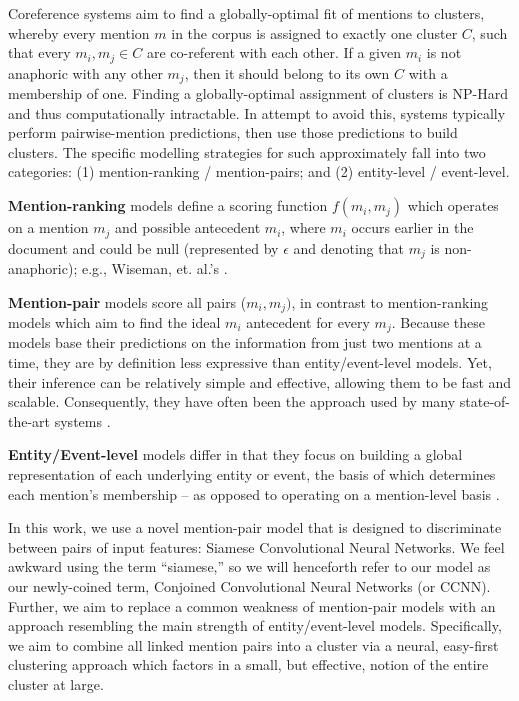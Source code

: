 \documentclass[11pt,a4paper]{article}
\begin{document}
Coreference systems aim to find a globally-optimal fit of mentions to clusters, whereby every mention $m$ in the corpus is assigned to exactly one cluster $C$, such that every ${m_i,m_j} \in C$ are co-referent with each other.  If a given $m_i$ is not anaphoric with any other $m_j$, then it should belong to its own $C$ with a membership of one.  Finding a globally-optimal assignment of clusters is NP-Hard and thus computationally intractable.  In attempt to avoid this, systems typically perform pairwise-mention predictions, then use those predictions to build clusters. The specific modelling strategies for such approximately fall into two categories: (1) mention-ranking / mention-pairs; and (2) entity-level / event-level.

\textbf{Mention-ranking} models define a scoring function $f(m_i,m_j)$ which operates on a mention $m_j$ and possible antecedent $m_i$, where $m_i$ occurs earlier in the document and could be null (represented by $\epsilon$ and denoting that $m_j$ is non-anaphoric); e.g., Wiseman, et. al.'s .

\textbf{Mention-pair} models score all pairs ($m_i,m_j)$, in contrast to mention-ranking models which aim to find the ideal $m_i$ antecedent for every $m_j$.  Because these models base their predictions on the information from just two mentions at a time, they are by definition less expressive than entity/event-level models.  Yet, their inference can be relatively simple and effective, allowing them to be fast and scalable.  Consequently, they have often been the approach used by many state-of-the-art systems \cite{Soon:2001:MLA:972597.972602,DBLP:conf/emnlp/DurrettK13}.

\textbf{Entity/Event-level} models differ in that they focus on building a global representation of each underlying entity or event, the basis of which determines each mention's membership -- as opposed to operating on a mention-level basis \cite{DBLP:journals/corr/WisemanRS16,clark2016improving}.

In this work, we use a novel mention-pair model that is designed to discriminate between pairs of input features: Siamese Convolutional Neural Networks.  We feel awkward using the term ``siamese,'' so we will henceforth refer to our model as our newly-coined term, Conjoined Convolutional Neural Networks (or CCNN).  Further, we aim to replace a common weakness of mention-pair models with an approach resembling the main strength of entity/event-level models. Specifically, we aim to combine all linked mention pairs into a cluster via a neural, easy-first clustering approach which factors in a small, but effective, notion of the entire cluster at large.
\end{document}
